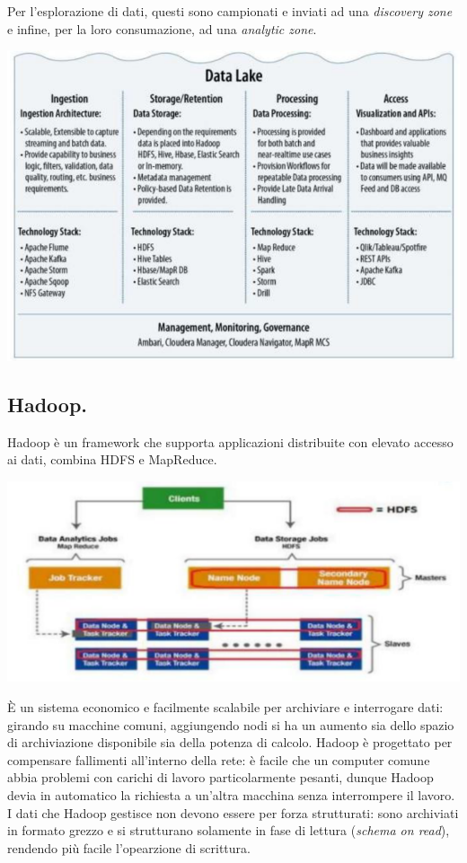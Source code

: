 \documentclass[a4page, 11pt]{article}
\begin{document}
Per l'esplorazione di dati, questi sono campionati e inviati ad una \textit{discovery zone} e infine, per la loro consumazione, ad una \textit{analytic zone}.
\begin{center}
  \includegraphics[scale=0.70]{IMAGE10.png}
\end{center}


\subsection{Hadoop.}
Hadoop è un framework che supporta applicazioni distribuite con elevato accesso ai dati, combina HDFS e MapReduce.
\begin{center}
  \includegraphics[scale=0.70]{IMAGE9.png}
\end{center}
È un sistema economico e facilmente scalabile per archiviare e interrogare dati: girando su macchine comuni, aggiungendo nodi si ha un aumento sia dello spazio di archiviazione disponibile sia della potenza di calcolo.
Hadoop è progettato per compensare fallimenti all'interno della rete: è facile che un computer comune abbia problemi con carichi di lavoro particolarmente pesanti, dunque Hadoop devia in automatico la richiesta a un'altra macchina senza interrompere il lavoro.
I dati che Hadoop gestisce non devono essere per forza strutturati: sono archiviati in formato grezzo e si strutturano solamente in fase di lettura (\textit{schema on read}), rendendo più facile l'opearzione di scrittura.
\end{document}
